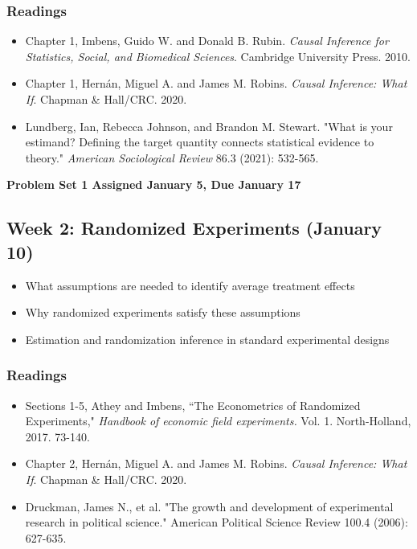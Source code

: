 \documentclass[11pt, article, oneside]{memoir}
\theoremstyle{Assumption}
\begin{document}
\subsubsection*{Readings}

\begin{itemize}
\item Chapter 1, Imbens, Guido W. and Donald B. Rubin. \emph{Causal Inference for Statistics, Social, and Biomedical Sciences}. Cambridge University Press.  2010.
\item Chapter 1, Hern\'an, Miguel A. and  James M. Robins. \emph{Causal Inference: What If}.  Chapman \& Hall/CRC. 2020.
\item Lundberg, Ian, Rebecca Johnson, and Brandon M. Stewart. "What is your estimand? Defining the target quantity connects statistical evidence to theory." \textit{American Sociological Review} 86.3 (2021): 532-565.
\end{itemize}

\textbf{Problem Set 1 Assigned January 5, Due January 17}

\subsection{Week 2: Randomized Experiments (January 10)}

\begin{itemize}
\item What assumptions are needed to identify average treatment effects
\item Why randomized experiments satisfy these assumptions
\item Estimation and randomization inference in standard experimental designs
\end{itemize}

\subsubsection*{Readings}

\begin{itemize}
\item Sections 1-5, Athey and Imbens, ``The Econometrics of Randomized Experiments,"  \textit{Handbook of economic field experiments.} Vol. 1. North-Holland, 2017. 73-140. 
\item Chapter 2, Hern\'an, Miguel A. and  James M. Robins. \textit{Causal Inference: What If}.  Chapman \& Hall/CRC. 2020.
\item Druckman, James N., et al. "The growth and development of experimental research in political science." American Political Science Review 100.4 (2006): 627-635.
\end{itemize}
\end{document}
